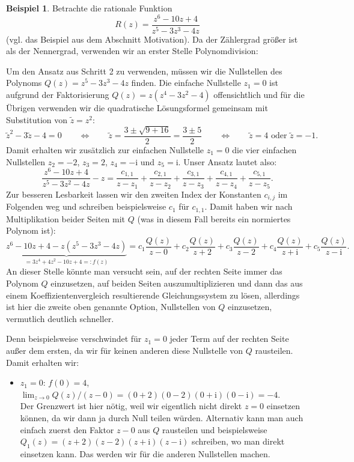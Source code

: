 \documentclass{article}
\theoremstyle{plain}
\theoremstyle{definition}
\newtheorem{example}{Beispiel}
\newcommand{\iu}{\mathrm{i}}
\begin{document}
\begin{example}
	Betrachte die rationale Funktion
	\[
		R(z) = \frac{z^6-10z+4}{z^5 - 3 z^3 - 4 z}
	\]
	(vgl. das Beispiel aus dem Abschnitt \glqq Motivation\grqq{}).
	Da der Zählergrad größer ist als der Nennergrad, verwenden wir an erster Stelle Polynomdivision:
	\begin{center}
	\end{center}
	Um den Ansatz aus Schritt 2 zu verwenden, müssen wir die Nullstellen des Polynoms $Q(z) = z^5 - 3 z^3 - 4 z$ finden.
	Die einfache Nullstelle $z_1 = 0$ ist aufgrund der Faktorisierung $Q(z) = z (z^4 - 3z^2 - 4)$ offensichtlich und für die Übrigen verwenden wir die quadratische Lösungsformel gemeinsam mit Substitution von $\tilde{z} = z^2$:
	\[
		\tilde{z}^2 - 3 \tilde{z} - 4 = 0 \qquad \iff \qquad \tilde{z} = \frac{3 \pm \sqrt{9 + 16}}{2} = \frac{3 \pm 5}{2} \qquad \iff \qquad \tilde{z} = 4 \text{ oder } \tilde{z} = -1.
	\]
	Damit erhalten wir zusätzlich zur einfachen Nullstelle $z_1 = 0$ die vier einfachen Nullstellen $z_2 = -2$, $z_3 = 2$, $z_4 = - \iu$ und $z_5 = \iu$.
	Unser Ansatz lautet also:
	\[
		\frac{z^6 - 10 z + 4}{z^5 - 3z^2 - 4z} - z = \frac{c_{1,1}}{z - z_1} + \frac{c_{2,1}}{z - z_2} + \frac{c_{3,1}}{z - z_3} + \frac{c_{4,1}}{z - z_4} + \frac{c_{5,1}}{z - z_5}.
	\]
	Zur besseren Lesbarkeit lassen wir den zweiten Index der Konstanten $c_{i, j}$ im Folgenden weg und schreiben beispielsweise $c_{1}$ für $c_{1, 1}$.
	Damit haben wir nach Multiplikation beider Seiten mit $Q$ (was in diesem Fall bereits ein normiertes Polynom ist):
	\[
		\underbrace{z^6 - 10 z + 4 - z (z^5 - 3z^3 - 4z)}_{=3 z^4 + 4z^2 - 10 z + 4 =: f(z)} = c_1 \frac{Q(z)}{z - 0} + c_2 \frac{Q(z)}{z + 2} + c_3 \frac{Q(z)}{z - 2} + c_4 \frac{Q(z)}{z + \iu} + c_5 \frac{Q(z)}{z - \iu}.
	\]
	An dieser Stelle könnte man versucht sein, auf der rechten Seite immer das Polynom $Q$ einzusetzen, auf beiden Seiten auszumultiplizieren und dann das aus einem Koeffizientenvergleich resultierende Gleichungssystem zu lösen, allerdings ist hier die zweite oben genannte Option, Nullstellen von $Q$ einzusetzen, vermutlich deutlich schneller.

	Denn beispielsweise verschwindet für $z_1 = 0$ jeder Term auf der rechten Seite außer dem ersten, da wir für keinen anderen diese Nullstelle von $Q$ rausteilen.
	Damit erhalten wir:
	\begin{itemize}
		\item $z_1 = 0$: $f(0) = 4$, \qquad $\lim_{z \to 0} Q(z)/(z - 0) = (0 + 2)(0 - 2)(0 + \iu)(0 - \iu) = -4$.\\
		      Der Grenzwert ist hier nötig, weil wir eigentlich nicht direkt $z = 0$ einsetzen können, da wir dann ja durch Null teilen würden.
		      Alternativ kann man auch einfach zuerst den Faktor $z - 0$ aus $Q$ rausteilen und beispielsweise $Q_1(z) = (z + 2)(z - 2)(z + \iu)(z - \iu)$ schreiben, wo man direkt einsetzen kann.
		      Das werden wir für die anderen Nullstellen machen.


\end{itemize}
\end{example}
\end{document}
